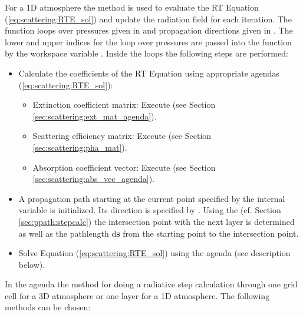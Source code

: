\label{sec:scattering:RT_methods}

For a 1D atmosphere the method   is used to
evaluate the RT Equation (\ref{eq:scattering:RTE_sol}) and update the
radiation field  for each iteration. 
The function loops over pressures given in  and
propagation directions given in .  
The lower and upper indices for the loop over pressures are passed
into the function by the workspace variable
. Inside the loops the following steps are
performed:
\begin{itemize}
\item Calculate the coefficients of the RT Equation using appropriate agendas 
  (\ref{eq:scattering:RTE_sol}):
  \begin{itemize}
  \item Extinction coefficient matrix: Execute  (see
    Section \ref{sec:scattering:ext_mat_agenda}).
  \item Scattering efficiency matrix: Execute  (see
    Section \ref{sec:scattering:pha_mat}).
  \item Absorption coefficient vector:  Execute  (see
    Section \ref{sec:scattering:abs_vec_agenda}).
  \end{itemize}
\item A  propagation path starting at the current point specified by
  the internal variable  is initialized. Its
  direction is specified by . Using the
   (cf. Section
  \ref{sec:ppath:stepcalc}) 
  the intersection point with the next
  layer is determined as well as the pathlength d{\bf s} from the starting
  point to the intersection point.  
\item Solve Equation (\ref{eq:scattering:RTE_sol}) using  the agenda
   (see description below).
\end{itemize}

In the agenda  the method for doing a
radiative step calculation through one grid cell for a 3D atmosphere
or one layer for a 1D atmosphere. The following methods can
be chosen:


